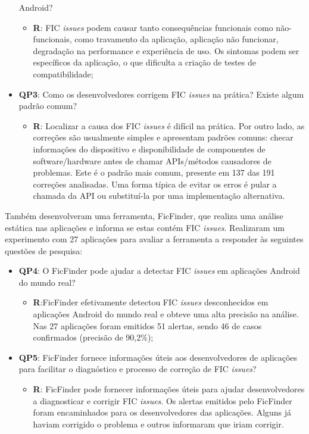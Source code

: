 \begin{itemize}
	Android?
	    \begin{itemize}
	        \item \textbf{R}: FIC \textit{issues} podem causar tanto consequências funcionais
	        como não-funcionais, como travamento da aplicação, aplicação não funcionar,
	        degradação na performance e experiência de uso. Os sintomas podem ser
	        específicos da aplicação, o que dificulta a criação de testes de
	        compatibilidade;
	    \end{itemize}
	\item \textbf{QP3}: Como os desenvolvedores corrigem FIC \textit{issues} na
	prática?
	Existe algum padrão comum?
	    \begin{itemize}
	    \item \textbf{R}: Localizar a causa dos FIC \textit{issues} é difícil na
	    prática.
	    Por outro lado, as correções são usualmente simples e apresentam padrões
	    comuns: checar informações do dispositivo e disponibilidade de componentes
	    de software/hardware antes de chamar APIs/métodos causadores de problemas.
	    Este é o padrão mais comum, presente em 137 das 191 correções analisadas.
	    Uma forma típica de evitar os erros é pular a chamada da API ou substituí-la
	    por uma implementação alternativa.
	    \end{itemize}
\end{itemize}

Também desenvolveram uma ferramenta, FicFinder, que realiza uma análise estática
nas aplicações e informa se estas contém FIC \textit{issues}. Realizaram um experimento
com 27 aplicações para avaliar a ferramenta a responder às seguintes questões de
pesquisa:
\begin{itemize}
    \item \textbf{QP4}: O FicFinder pode ajudar a detectar FIC \textit{issues} em
    aplicações Android do mundo real?
        \begin{itemize}
            \item \textbf{R}:FicFinder efetivamente detectou FIC \textit{issues}
            desconhecidos em aplicações Android do mundo real e obteve uma alta
            precisão na análise. Nas 27 aplicações foram emitidos 51 alertas,
            sendo 46 de casos confirmados (precisão de 90,2\%);
        \end{itemize}
    \item \textbf{QP5}: FicFinder fornece informações úteis aos desenvolvedores
    de aplicações para facilitar o diagnóstico e processo de correção de FIC
    \textit{issues}?
        \begin{itemize}
            \item \textbf{R}: FicFinder pode fornecer informações úteis para ajudar
            desenvolvedores a diagnosticar e corrigir FIC \textit{issues}. Os
            alertas emitidos pelo FicFinder foram encaminhados para os desenvolvedores
            das aplicações. Alguns já haviam corrigido o problema e outros informaram
            que iriam corrigir.
        \end{itemize}
\end{itemize}

